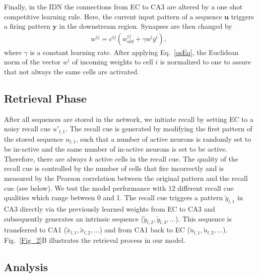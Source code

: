 \documentclass[utf8]{frontiersSCNS} %
\begin{document}
Finally, in the IDN the connections from EC to CA3 are altered by a one shot competitive learning rule. Here, the current input pattern of a sequence $\mathbf u$ triggers a firing pattern $\mathbf y$ in the downstream region. Synapses are then changed by
\begin{align}
	\label{osEq}
	w^{ij} = c^{ij}(w^{ij}_{old} + \gamma u^jy^i),
\end{align}
where $\gamma$ is a constant learning rate. After applying Eq.~\ref{osEq}, the Euclidean norm of the vector $w^i$ of incoming weights to cell $i$ is normalized to one to assure that not always the same cells are activated. 



\subsection{Retrieval Phase}
\label{S:4}


After all sequences are stored in the network, we initiate recall by setting EC to a noisy recall cue $u'_{l, 1}$.  The recall cue is generated by modifying the first pattern of the stored sequence $u_{l, 1}$, such that a number of active neurons is randomly set to be in-active and the same number of in-active neurons is set to be active. Therefore, there are always $k$ active cells in the recall cue. The quality of the recall cue is controlled by the number of cells that fire incorrectly and is measured by the Pearson correlation between the original pattern and the recall cue (see below). We test the model performance with $12$ different recall cue qualities which range between 0 and 1.      
%
The recall cue triggers a pattern $\tilde{y}_{l, 1}$ in CA3 directly via the previously learned weights from EC to CA3 and subsequently generates an intrinsic sequence ($\tilde{y}_{l, 2}, \tilde{y}_{l, 3}, \ldots$). This sequence is transferred to CA1 ($\tilde{x}_{l, 1}, \tilde{x}_{l, 2}, \ldots$) and from CA1 back to EC ($\tilde{u}_{l, 1}, \tilde{u}_{l, 2}, \ldots$). Fig.~\ref{Fig_2}B illustrates the retrieval process in our model. 


\subsection{Analysis}
\end{document}
